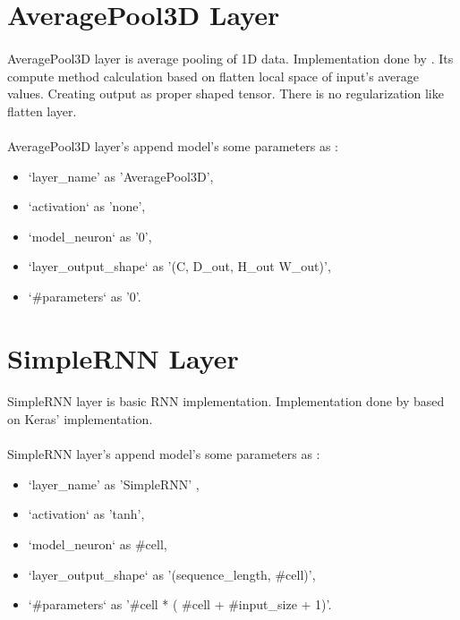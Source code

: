 \documentclass[12pt]{report}
\begin{document}
\section{AveragePool3D Layer}

\paragraph{}
AveragePool3D layer is average pooling of 1D data. Implementation done by \cite{MGK}. Its compute method calculation based on flatten local space of input's average values. Creating output as proper shaped tensor. There is no regularization like flatten layer.

\paragraph{}
AveragePool3D layer's append model's some parameters as :
\begin{itemize}
	\item `layer\_name' as 'AveragePool3D',
	\item `activation` as 'none',
	\item `model\_neuron` as '0',
	\item `layer\_output\_shape` as '(C, D\_out, H\_out W\_out)',
	\item `\#parameters` as '0'.
\end{itemize}



\section{SimpleRNN Layer}

\paragraph{}
SimpleRNN layer is basic RNN implementation. Implementation done by \cite{MGK} based on Keras' \cite{Keras} implementation. 

\paragraph{}
SimpleRNN layer's append model's some parameters as :
\begin{itemize}
	\item `layer\_name' as 'SimpleRNN' ,
	\item `activation` as 'tanh',
	\item `model\_neuron` as \#cell,
	\item `layer\_output\_shape` as '(sequence\_length, \#cell)',
	\item `\#parameters` as '\#cell * ( \#cell + \#input\_size + 1)'.
\end{itemize}
\end{document}
